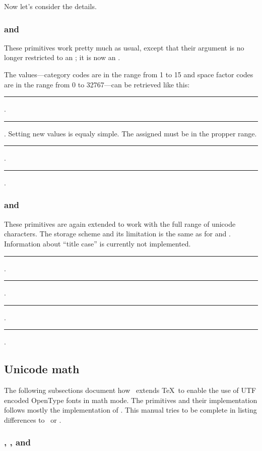 Now let's consider the details.

\subsubsection{ and }
These primitives work pretty much as usual, except that their argument
is no longer restricted to an ;
it is now an .

The values---category codes are in the range from 1 to 15 and
space factor codes are in the range from 0 to 32767---can be retrieved like this:
\medskip
\rule{}:
.
\rule{}:
.
\medskip
Setting new values is equaly simple. The assigned  must be in the
propper range.
\medskip
\rule{}:
 \opt{\.{=}} .
\rule{}:
 \opt{\.{=}} .
\medskip

\subsubsection{ and }
These primitives are again extended to work with the full range of unicode
characters. The storage scheme and its limitation is the same as for
 and .
Information about ``title case'' is currently not implemented.
\medskip
\rule{}:
.
\rule{}:
.
\rule{}:
 \opt{\.{=}} .
\rule{}:
 \opt{\.{=}} .
\medskip

\subsection{Unicode math}

The following subsections document how \HiTeX\ extends \TeX\ to enable
the use of UTF encoded OpenType fonts in math mode. The primitives and their
implementation follows mostly the implementation of \XeTeX. This manual tries
to be complete in listing  differences to \XeTeX\ or \LuaTeX.

\subsubsection{, , and }

